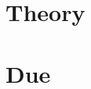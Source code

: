 \documentclass[a4paper,twoside]{book}
\begin{document}
     


\chapter{Theory}


\chapter{Due}



\end{document}
